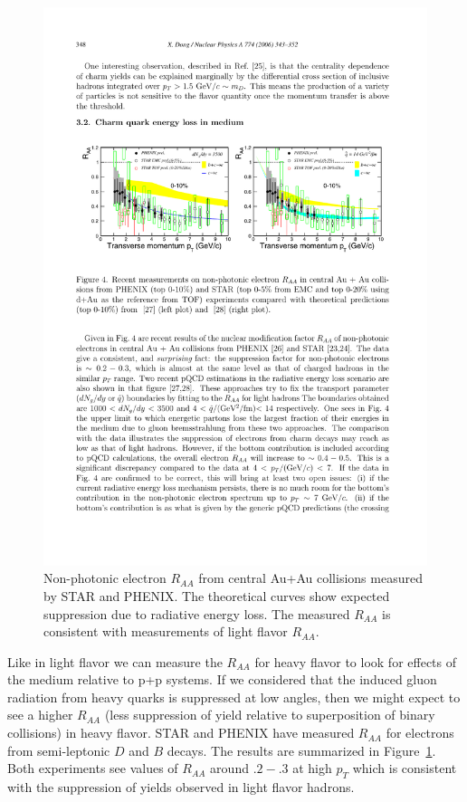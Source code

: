 \begin{figure}[htbp]
\begin{center}
\includegraphics[scale=1.8]{Plots/Intro/hf_raa.pdf}
\end{center}
\caption[NPE $R_{AA}$]{Non-photonic electron $R_{AA}$ from central Au+Au collisions measured by STAR and PHENIX. The theoretical curves show expected suppression due to radiative energy loss. The measured $R_{AA}$ is consistent with measurements of light flavor $R_{AA}$.}
\label{fig:hf_raa}
\end{figure}

Like in light flavor we can measure the $R_{AA}$ for heavy flavor to look for effects of the medium relative to p+p systems. If we considered that the induced gluon radiation from heavy quarks is suppressed at low angles, then we might expect to see a higher $R_{AA}$ (less suppression of yield relative to superposition of binary collisions) in heavy flavor. STAR and PHENIX have measured $R_{AA}$ for electrons from semi-leptonic $D$ and $B$ decays. The results are summarized in Figure~\ref{fig:hf_raa}. Both experiments see values of $R_{AA}$ around $.2-.3$ at high $p_T$ which is consistent with the suppression of yields observed in light flavor hadrons.

